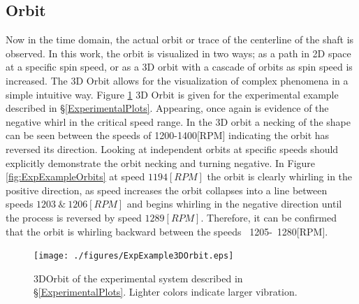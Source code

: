 \subsection{Orbit}
Now in the time domain, the actual orbit or trace of the centerline of the shaft is observed. In this work, the orbit is visualized in two ways; as a path in 2D space at a specific spin speed, or as a 3D orbit with a cascade of orbits as spin speed is increased. The 3D Orbit allows for the visualization of complex phenomena in a simple intuitive way. Figure \ref{fig:ExpExample3DOrbit} 3D Orbit is given for the experimental example described in \S\ref{ExperimentalPlots}. Appearing, once again is evidence of the negative whirl in the critical speed range. In the 3D orbit a necking of the shape can be seen between the speeds of 1200-1400[RPM] indicating the orbit has reversed its direction. Looking at independent orbits at specific speeds should explicitly demonstrate the orbit necking and turning negative. In Figure \ref{fig:ExpExampleOrbits} at speed $ 1194[RPM] $ the orbit is clearly whirling in the positive direction, as speed increases the orbit collapses into a line between speeds $ 1203\ \&\ 1206[RPM] $ and begins whirling in the negative direction until the process is reversed by speed $ 1289[RPM] $. Therefore, it can be confirmed that the orbit is whirling backward between the speeds ~1205-~1280[RPM].\par
\begin{figure}
	\centering
	\texttt{[image: ./figures/ExpExample3DOrbit.eps]}
	\caption{3DOrbit of the experimental system described in \S\ref{ExperimentalPlots}. Lighter colors indicate larger vibration.}
	\label{fig:ExpExample3DOrbit}
\end{figure}
